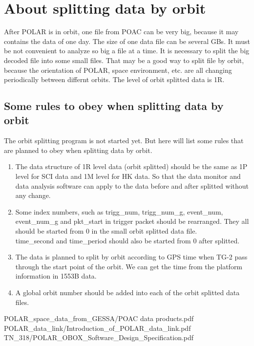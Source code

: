 \documentclass[a4paper, 12pt, onecolumn]{article}
\begin{document}
\newpage

\section{About splitting data by orbit}
After POLAR is in orbit, one file from POAC can be very big, because it may contains the data of one day.
The size of one data file can be several GBs. It must be not convenient to analyze so big a file at a time.
It is necessary to split the big decoded file into some small files. That may be a good way to split file by orbit,
because the orientation of POLAR, space environment, etc. are all changing periodically between differnt orbits.
The level of orbit splitted data is 1R.

\subsection{Some rules to obey when splitting data by orbit}
The orbit splitting program is not started yet. But here will list some rules that are planned to obey when splitting data by orbit.

\begin{enumerate}
\item The data structure of 1R level data (orbit splitted) should be the same as 1P level for SCI data and 1M level for HK data.
  So that the data monitor and data analysis software can apply to the data before and after splitted without any change.
\item Some index numbers, such as trigg\_num, trigg\_num\_g, event\_num, \\ event\_num\_g and pkt\_start in trigger packet should be rearranged.
  They all should be started from 0 in the small orbit splitted data file. \\ time\_second and time\_period should also be started from 0 after splitted.
\item The data is planned to split by orbit according to GPS time when TG-2 pass through the start point of the orbit.
  We can get the time from the platform information in 1553B data.
\item A global orbit number should be added into each of the orbit splitted data files.
\end{enumerate}

\begin{thebibliography}{9}
 POLAR\_space\_data\_from\_GESSA/POAC data products.pdf
 POLAR\_data\_link/Introduction\_of\_POLAR\_data\_link.pdf
 TN\_318/POLAR\_OBOX\_Software\_Design\_Specification.pdf
\end{thebibliography}
\end{document}
